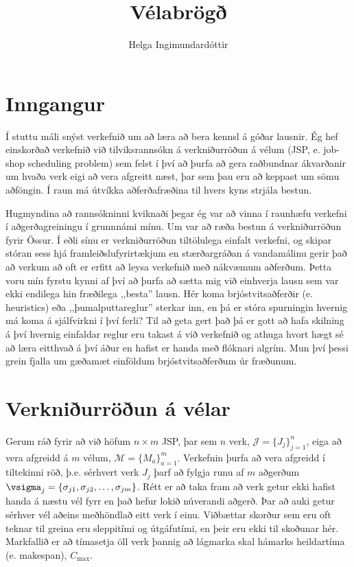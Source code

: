 \documentclass[]{article}
\title{Vélabrögð} %
\author{Helga Ingimundardóttir}
\begin{document}
\maketitle


\section{Inngangur}
Í stuttu máli snýst verkefnið um að læra að bera kennsl á góðar lausnir. 
Ég hef einskorðað verkefnið við tilviksrannsókn á verkniðurröðun á vélum (JSP, 
e. job-shop scheduling problem) 
sem felst í því að þurfa að gera raðbundnar ákvarðanir um hvaða verk eigi 
að vera afgreitt næst, þar sem þau eru að keppast um sömu aðföngin.
Í raun má útvíkka aðferðafræðina til hvers kyns strjála bestun. 

Hugmyndina að rannsókninni kviknaði þegar ég var að vinna í raunhæfu verkefni í 
aðgerðagreiningu í grunnnámi mínu. Um var að ræða bestun á verkniðurröðun fyrir 
Össur. Í eðli sínu er verkniðurröðun tiltölulega einfalt verkefni, og skipar 
stóran sess hjá framleiðslufyrirtækjum en stærðargráðan á vandamálinu gerir það 
að verkum að oft er erfitt að leysa verkefnið með nákvæmum aðferðum. 
Þetta voru mín fyrstu kynni af því að þurfa að sætta mig við einhverja lausn 
sem var ekki endilega hin fræðilega ,,besta'' lausn. 
Hér koma brjóstvitsaðferðir (e. heuristics) eða ,,þumalputtareglur'' sterkar 
inn, en þá er stóra spurningin hvernig má koma á sjálfvirkni í því ferli? 
Til að geta gert það þá er gott að hafa skilning á því hvernig einfaldar 
reglur eru takast á við verkefnið og athuga hvort hægt sé að læra eitthvað á 
því áður en hafist er handa með flóknari algrím. 
Mun því þessi grein fjalla um gæðamæt einföldum brjóstvitsaðferðum úr fræðunum. 

\section{Verkniðurröðun á vélar}
Gerum ráð fyrir að við höfum $n\times m$ JSP, 
þar sem $n$ verk, $\mathcal{J}=\{J_j\}_{j=1}^n$, 
eiga að vera afgreidd á $m$ vélum, $\mathcal{M}=\{M_a\}_{a=1}^m$. 
Verkefnin þurfa að vera afgreidd í tiltekinni röð, þ.e. sérhvert verk $J_j$ 
þarf að fylgja runu af $m$ aðgerðum 
$\vsigma_j=\{\sigma_{j1},\sigma_{j2},\dotsc,\sigma_{jm}\}$. 
Rétt er að taka fram að verk getur ekki hafist handa á næstu vél fyrr en það 
hefur lokið núverandi aðgerð. 
Þar að auki getur sérhver vél aðeins meðhöndlað eitt verk í einu. 
Viðbættar skorður sem eru oft teknar til greina eru sleppitími og útgáfutími, 
en þeir eru ekki til skoðunar hér.
Markfallið er að tímasetja öll verk þannig að lágmarka skal hámarks heildartíma 
(e. makespan), $C_{\max}$. 
\end{document}
